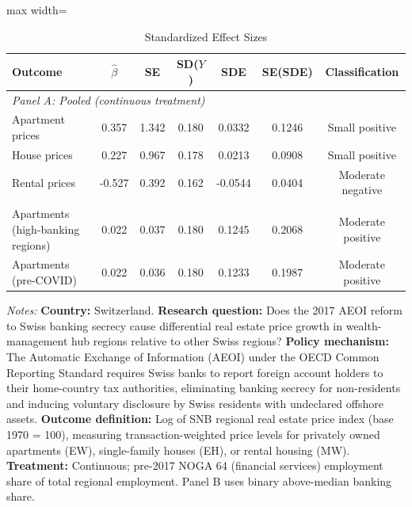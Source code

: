 \begin{table}[t]
\centering
\caption{Standardized Effect Sizes}
\label{tab:sde}
\begin{threeparttable}
\begin{adjustbox}{max width=\textwidth}
\begin{tabular}{lcccccc}
\toprule
Outcome & $\hat{\beta}$ & SE & SD($Y$) & SDE & SE(SDE) & Classification \\
\midrule
\multicolumn{7}{l}{\textit{Panel A: Pooled (continuous treatment)}} \\
Apartment prices & 0.357 & 1.342 & 0.180 & 0.0332 & 0.1246 & Small positive \\
House prices & 0.227 & 0.967 & 0.178 & 0.0213 & 0.0908 & Small positive \\
Rental prices & -0.527 & 0.392 & 0.162 & -0.0544 & 0.0404 & Moderate negative \\
\addlinespace
\multicolumn{7}{l}{\textit{Panel B: Heterogeneous (binary treatment)}} \\
Apartments (high-banking regions) & 0.022 & 0.037 & 0.180 & 0.1245 & 0.2068 & Moderate positive \\
Apartments (pre-COVID) & 0.022 & 0.036 & 0.180 & 0.1233 & 0.1987 & Moderate positive \\
\bottomrule
\end{tabular}
\end{adjustbox}
\end{threeparttable}
\par\vspace{0.5em}
\begin{minipage}{\textwidth}\scriptsize
\textit{Notes:} \textbf{Country:} Switzerland.
\textbf{Research question:} Does the 2017 AEOI reform to Swiss banking secrecy cause differential real estate price growth in wealth-management hub regions relative to other Swiss regions?
\textbf{Policy mechanism:} The Automatic Exchange of Information (AEOI) under the OECD Common Reporting Standard requires Swiss banks to report foreign account holders to their home-country tax authorities, eliminating banking secrecy for non-residents and inducing voluntary disclosure by Swiss residents with undeclared offshore assets.
\textbf{Outcome definition:} Log of SNB regional real estate price index (base 1970 = 100), measuring transaction-weighted price levels for privately owned apartments (EW), single-family houses (EH), or rental housing (MW).
\textbf{Treatment:} Continuous; pre-2017 NOGA 64 (financial services) employment share of total regional employment. Panel B uses binary above-median banking share.

\end{minipage}
\end{table}
